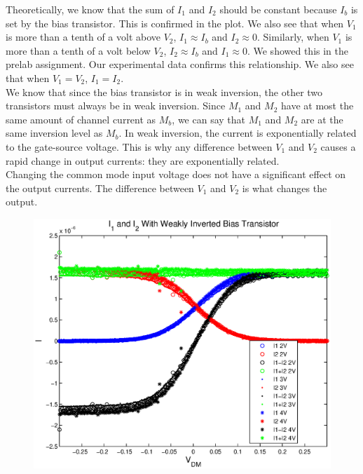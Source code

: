 \documentclass{article}
\begin{document}
Theoretically, we know that the sum of $I_1$ and $I_2$ should be constant because $I_b$ is set by the bias transistor. This is confirmed in the plot. We also see that when $V_1$ is more than a tenth of a volt above $V_2$, $I_1 \approx I_b$ and $I_2 \approx 0$. Similarly, when $V_1$ is more than a tenth of a volt below $V_2$, $I_2 \approx I_b$ and $I_1 \approx 0$. We showed this in the prelab assignment. Our experimental data confirms this relationship. We also see that when $V_1=V_2$, $I_1=I_2$.\\

We know that since the bias transistor is in weak inversion, the other two transistors must always be in weak inversion. Since $M_1$ and $M_2$ have at most the same amount of channel current as $M_b$, we can say that $M_1$ and $M_2$ are at the same inversion level as $M_b$. In weak inversion, the current is exponentially related to the gate-source voltage. This is why any difference between $V_1$ and $V_2$ causes a rapid change in output currents: they are exponentially related.\\

Changing the common mode input voltage does not have a significant effect on the output currents. The difference between $V_1$ and $V_2$ is what changes the output.\\

\begin{figure}[H]
\centering
\includegraphics[scale=.95]{currents_weak.eps}
\label{weak}
\caption{}
\end{figure}
\end{document}
